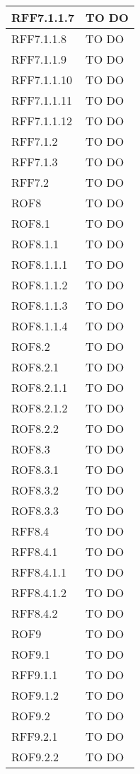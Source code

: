\begin{center}
\begin{longtable}{| p{4cm} | p{8cm} |}
\hline
RFF7.1.1.7   &  TO DO \\
\hline
RFF7.1.1.8   &  TO DO \\
\hline
RFF7.1.1.9   &  TO DO \\
\hline
RFF7.1.1.10   &  TO DO \\
\hline
RFF7.1.1.11   &  TO DO \\
\hline
RFF7.1.1.12   &  TO DO \\
\hline
RFF7.1.2   &  TO DO \\
\hline
RFF7.1.3   &  TO DO \\
\hline
RFF7.2   &  TO DO \\
\hline
ROF8   &  TO DO \\
\hline
ROF8.1   &  TO DO \\
\hline
ROF8.1.1   &  TO DO \\
\hline
ROF8.1.1.1   &  TO DO \\
\hline
ROF8.1.1.2   &  TO DO \\
\hline
ROF8.1.1.3   &  TO DO \\
\hline
ROF8.1.1.4   &  TO DO \\
\hline
ROF8.2   &  TO DO \\
\hline
ROF8.2.1   &  TO DO \\
\hline
ROF8.2.1.1   &  TO DO \\
\hline
ROF8.2.1.2   &  TO DO \\
\hline
ROF8.2.2   &  TO DO \\
\hline
ROF8.3   &  TO DO \\
\hline
ROF8.3.1   &  TO DO \\
\hline
ROF8.3.2   &  TO DO \\
\hline
ROF8.3.3   &  TO DO \\
\hline
RFF8.4   &  TO DO \\
\hline
RFF8.4.1   &  TO DO \\
\hline
RFF8.4.1.1   &  TO DO \\
\hline
RFF8.4.1.2   &  TO DO \\
\hline
RFF8.4.2   &  TO DO \\
\hline
ROF9   &  TO DO \\
\hline
ROF9.1   &  TO DO \\
\hline
RFF9.1.1   &  TO DO \\
\hline
ROF9.1.2   &  TO DO \\
\hline
ROF9.2   &  TO DO \\
\hline
RFF9.2.1   &  TO DO \\
\hline
ROF9.2.2   &  TO DO \\
\hline

\end{longtable}
\end{center}
